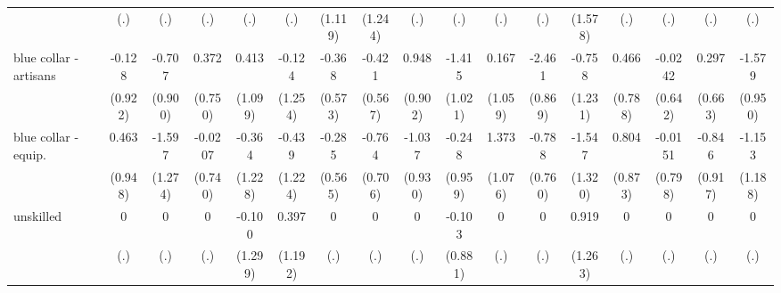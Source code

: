 {\begin{tabular}{l*{16}{c}}
                    &         (.)         &         (.)         &         (.)         &         (.)         &         (.)         &     (1.119)         &     (1.244)         &         (.)         &         (.)         &         (.)         &         (.)         &     (1.578)         &         (.)         &         (.)         &         (.)         &         (.)         \\
[1em]
blue collar - artisans&      -0.128         &      -0.707         &       0.372         &       0.413         &      -0.124         &      -0.368         &      -0.421         &       0.948         &      -1.415         &       0.167         &      -2.461\sym{**} &      -0.758         &       0.466         &     -0.0242         &       0.297         &      -1.579         \\
                    &     (0.922)         &     (0.900)         &     (0.750)         &     (1.099)         &     (1.254)         &     (0.573)         &     (0.567)         &     (0.902)         &     (1.021)         &     (1.059)         &     (0.869)         &     (1.231)         &     (0.788)         &     (0.642)         &     (0.663)         &     (0.950)         \\
[1em]
blue collar - equip.&       0.463         &      -1.597         &     -0.0207         &      -0.364         &      -0.439         &      -0.285         &      -0.764         &      -1.037         &      -0.248         &       1.373         &      -0.788         &      -1.547         &       0.804         &     -0.0151         &      -0.846         &      -1.153         \\
                    &     (0.948)         &     (1.274)         &     (0.740)         &     (1.228)         &     (1.224)         &     (0.565)         &     (0.706)         &     (0.930)         &     (0.959)         &     (1.076)         &     (0.760)         &     (1.320)         &     (0.873)         &     (0.798)         &     (0.917)         &     (1.188)         \\
[1em]
unskilled           &           0         &           0         &           0         &      -0.100         &       0.397         &           0         &           0         &           0         &      -0.103         &           0         &           0         &       0.919         &           0         &           0         &           0         &           0         \\
                    &         (.)         &         (.)         &         (.)         &     (1.299)         &     (1.192)         &         (.)         &         (.)         &         (.)         &     (0.881)         &         (.)         &         (.)         &     (1.263)         &         (.)         &         (.)         &         (.)         &         (.)         \\

\end{tabular}}
